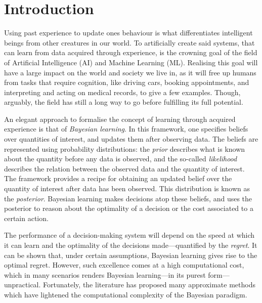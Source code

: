 \chapter{Introduction}  %

Using past experience to update ones behaviour is what differentiates intelligent beings from other creatures in our world. To artificially create said systems, that can learn from data acquired through experience, is the crowning goal of the field of Artificial Intelligence (AI) and Machine Learning (ML).
Realising this goal will have a large impact on the world and society we live in, as it will free up humans from tasks that require cognition, like driving cars, booking appointments, and interpreting and acting on medical records, to give a few examples. Though, arguably, the field has still a long way to go before fulfilling its full potential.

An elegant approach to formalise the concept of learning through acquired experience is that of \emph{Bayesian learning}. In this framework, one specifies beliefs over quantities of interest, and updates them after observing data. The beliefs are represented using probability distributions: the \emph{prior} describes what is known about the quantity before any data is observed, and the so-called \emph{likelihood} describes the relation between the observed data and the quantity of interest. The framework provides a recipe for obtaining an updated belief over the quantity of interest after data has been observed. This distribution is known as the \emph{posterior}. Bayesian learning makes decisions atop these beliefs, and uses the posterior to reason about the optimality of a decision or the cost associated to a certain action.

The performance of a decision-making system will depend on the speed at which it can learn and the optimality of the decisions made---quantified by the \emph{regret}. It can be shown that, under certain assumptions, Bayesian learning gives rise to the optimal regret. However, such excellence comes at a high computational cost, which in many scenarios renders Bayesian learning---in its purest form---unpractical. Fortunately, the literature has proposed many approximate methods which have lightened the computational complexity of the Bayesian paradigm.

